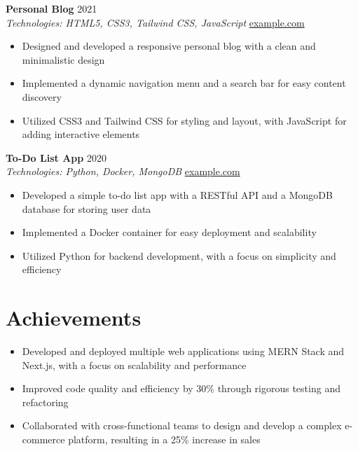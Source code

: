 \documentclass[a4paper,11pt]{article}
\begin{document}
\vspace{5pt}
\textbf{Personal Blog} \hfill 2021 \\
\textit{Technologies: HTML5, CSS3, Tailwind CSS, JavaScript} \hfill \href{https://example.com}{example.com}
\begin{itemize}[noitemsep, topsep=1pt, itemsep=1pt, leftmargin=*]
\item Designed and developed a responsive personal blog with a clean and minimalistic design
\item Implemented a dynamic navigation menu and a search bar for easy content discovery
\item Utilized CSS3 and Tailwind CSS for styling and layout, with JavaScript for adding interactive elements
\end{itemize}

\vspace{5pt}
\textbf{To-Do List App} \hfill 2020 \\
\textit{Technologies: Python, Docker, MongoDB} \hfill \href{https://example.com}{example.com}
\begin{itemize}[noitemsep, topsep=1pt, itemsep=1pt, leftmargin=*]
\item Developed a simple to-do list app with a RESTful API and a MongoDB database for storing user data
\item Implemented a Docker container for easy deployment and scalability
\item Utilized Python for backend development, with a focus on simplicity and efficiency
\end{itemize}

\section*{Achievements}
\begin{itemize}[noitemsep, topsep=1pt, itemsep=1pt, leftmargin=*]
\item Developed and deployed multiple web applications using MERN Stack and Next.js, with a focus on scalability and performance
\item Improved code quality and efficiency by 30\% through rigorous testing and refactoring
\item Collaborated with cross-functional teams to design and develop a complex e-commerce platform, resulting in a 25\% increase in sales
\end{itemize}
\end{document}
